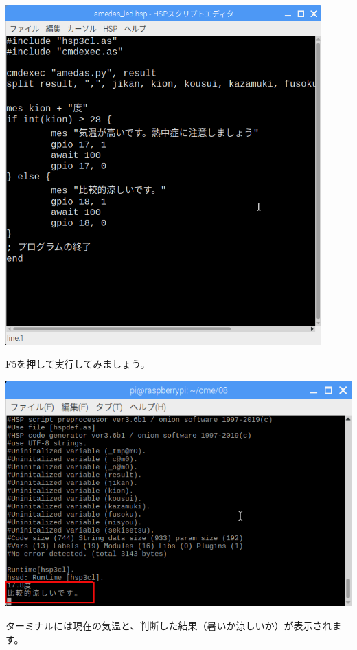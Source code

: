 \documentclass[a4paper,12pt,dvipdfmx]{jarticle}
\begin{document}
\begin{center}
\includegraphics[width=12.173cm]{textbook-img038.png}

\end{center}

\bigskip


\bigskip

\clearpage
F5を押して実行してみましょう。



\begin{center}
\includegraphics[width=17.006cm]{textbook-img039.png}

\end{center}
ターミナルには現在の気温と、判断した結果（暑いか涼しいか）が表示されます。
\end{document}
